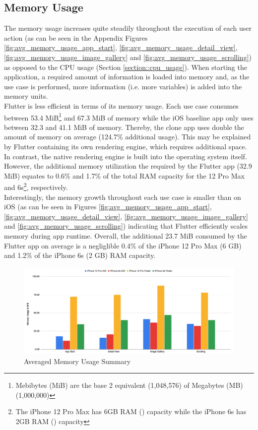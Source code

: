 \subsection{Memory Usage}
The memory usage increases quite steadily throughout the execution of each user action (as can be seen in the Appendix Figures \ref{fig:avg_memory_usage_app_start}, \ref{fig:avg_memory_usage_detail_view}, \ref{fig:avg_memory_usage_image_gallery} and \ref{fig:avg_memory_usage_scrolling}) as opposed to the CPU usage (Section \ref{section::cpu_usage}).
When starting the application, a required amount of information is loaded into memory and, 
as the use case is performed, more information (i.e. more variables) is added into the memory units.\\
Flutter is less efficient in terms of its memory usage. Each use case consumes between 53.4 MiB\footnote{Mebibytes (MiB) are the base 2 equivalent (1,048,576) of Megabytes (MB) (1,000,000)} and 67.3 MiB of memory while the iOS baseline app only uses between 32.3 and 41.1 MiB of memory.
Thereby, the clone app uses double the amount of memory on average (124.7\% additional usage).
This may be explained by Flutter containing its own rendering engine, which requires additional space. In contrast, the native rendering engine is built into the operating system itself.\\
However, the additional memory utilization the required by the Flutter app (32.9 MiB) equates to 0.6\% and 1.7\% of the total RAM capacity for the 12 Pro Max and 6s\footnote{The iPhone 12 Pro Max has 6GB RAM (\cite{GSMArena12ProMax2020}) capacity while the iPhone 6s has 2GB RAM (\cite{GSMArena2015}) capacity}, respectively.\\
Interestingly, the memory growth throughout each use case is smaller than on iOS (as can be seen in Figures \ref{fig:avg_memory_usage_app_start}, \ref{fig:avg_memory_usage_detail_view}, \ref{fig:avg_memory_usage_image_gallery} and \ref{fig:avg_memory_usage_scrolling}) indicating that Flutter efficiently scales memory during app runtime.
Overall, the additional 23.7 MiB consumed by the Flutter app on average is a negliglible 0.4\% of the iPhone 12 Pro Max (6 GB) and 1.2\% of the 
iPhone 6s (2 GB) RAM capacity.

\begin{figure}[!h]
    \centering
    \includegraphics[width=\linewidth]{images/performance_results/summary_charts/avg_memory_usage_summary.png}
    \caption{Averaged Memory Usage Summary}
    \label{fig:avg_memory_usage_summary}
\end{figure}

